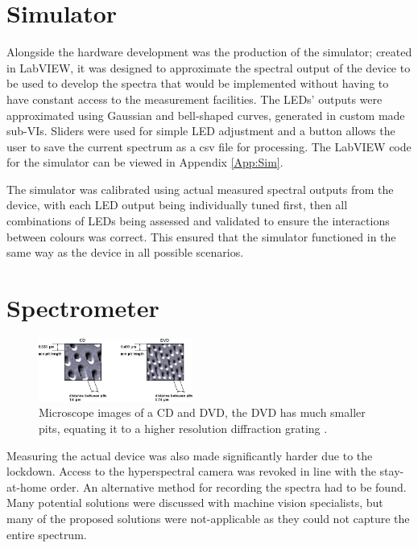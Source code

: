\section{Simulator}

Alongside the hardware development was the production of the simulator; created in LabVIEW, it was designed to approximate the spectral output of the device to be used to develop the spectra that would be implemented without having to have constant access to the measurement facilities. The LEDs' outputs were approximated using Gaussian and bell-shaped curves, generated in custom made sub-VIs. Sliders were used for simple LED adjustment and a button allows the user to save the current spectrum as a csv file for processing. The LabVIEW code for the simulator can be viewed in Appendix \ref{App:Sim}.

The simulator was calibrated using actual measured spectral outputs from the device, with each LED output being individually tuned first, then all combinations of LEDs being assessed and validated to ensure the interactions between colours was correct. This ensured that the simulator functioned in the same way as the device in all possible scenarios.

\section{Spectrometer}

\begin{figure}[b]
\centering
\includegraphics[width=0.45\textwidth]{images/CDDVD.jpg}
\caption{Microscope images of a CD and DVD, the DVD has much smaller pits, equating it to a higher resolution diffraction grating \citep{avsdiskcreatorAVS4YOUAVSDisc2019}.}
\label{Fig:CDDVD}
\end{figure}

Measuring the actual device was also made significantly harder due to the lockdown. Access to the hyperspectral camera was revoked in line with the stay-at-home order. An alternative method for recording the spectra had to be found. Many potential solutions were discussed with machine vision specialists, but many of the proposed solutions were not-applicable as they could not capture the entire spectrum.


